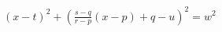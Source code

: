 \documentclass[preview]{standalone}
\begin{document}
\begin{center}
$(x - t)^2 + (\frac{s - q}{r - p} (x - p) + q - u)^2 = w^2$
\end{center}
\end{document}
